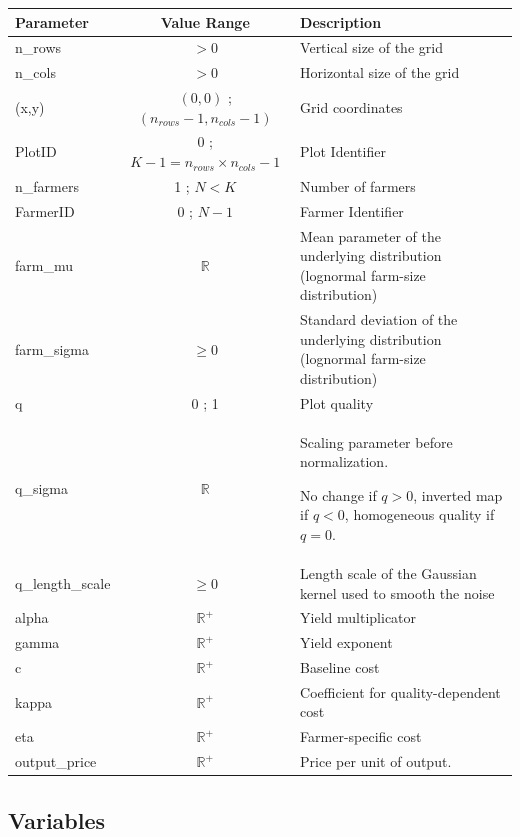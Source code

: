 \documentclass{article}
\begin{document}
\begin{table}[h!]
\centering
\begin{tabular}{|l|c|p{5cm}|}
\hline
\textbf{Parameter} & \textbf{Value Range} & \textbf{Description} \\
\hline
n\_rows & $> 0$ & Vertical size of the grid  \\
\hline
n\_cols & $> 0$ & Horizontal size of the grid  \\
\hline
(x,y) & $ (0,0)$ ; $(n_{rows}-1, n_{cols}-1) $ & Grid coordinates \\
\hline
PlotID & 0 ; $K - 1 = n_{rows} \times n_{cols} - 1$ & Plot Identifier \\
\hline
\hline
n\_farmers & 1 ; $N < K$ & Number of farmers \\
\hline
FarmerID & 0 ; $N - 1$ & Farmer Identifier \\
\hline
farm\_mu & $\mathbb{R}$ & Mean parameter of the underlying distribution (lognormal farm-size distribution) \\
\hline
farm\_sigma & $\geq 0$ & Standard deviation of the underlying distribution (lognormal farm-size distribution) \\
\hline
\hline
q & 0 ; 1 & Plot quality \\
\hline
q\_sigma & $\mathbb{R}$ & Scaling parameter before normalization. 

No change if $q > 0$, inverted map if $q < 0$, homogeneous quality if $q = 0$. \\
\hline
q\_length\_scale & $\geq 0$ & Length scale of the Gaussian kernel used to smooth the noise \\
\hline
\hline
alpha & $\mathbb{R}^+$ & Yield multiplicator\\
\hline
gamma & $\mathbb{R}^+$ & Yield exponent\\
\hline
c & $\mathbb{R}^+$ & Baseline cost  \\
\hline
kappa & $\mathbb{R}^+$ & Coefficient for quality-dependent cost \\
\hline
eta & $\mathbb{R}^+$ & Farmer-specific cost \\
\hline
output\_price & $\mathbb{R}^+$ & Price per unit of output. \\
\hline
\end{tabular}
\end{table}

\subsection{Variables}
\end{document}

